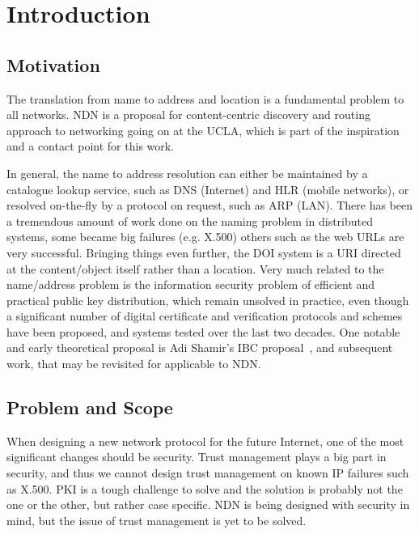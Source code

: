 \chapter{Introduction}\label{chp:introduction} 

\section{Motivation}
The translation from name to address and location is a fundamental problem to all networks.
\gls{NDN} is a proposal for content-centric discovery and routing approach to networking
going on at the \gls{UCLA}, which is part of the inspiration and a contact point for this work.

In general, the name to address resolution can either be maintained by a catalogue lookup service, 
such as \gls{DNS} (Internet) and \gls{HLR} (mobile networks), 
or resolved on-the-fly by a protocol on request, such as \gls{ARP} (\gls{LAN}). 
There has been a tremendous amount of work done on the naming problem in distributed systems, 
some became big failures (e.g. X.500) others such as the web \gls{URL}s are very successful. 
Bringing things even further, the \gls{DOI} system is a \gls{URI} directed at the content/object itself rather than a location. 
Very much related to the name/address problem is the information security problem of efficient and practical public key distribution, 
which remain unsolved in practice, even though a significant number of digital certificate and verification protocols and schemes have been proposed, and systems tested over the last two decades. 
One notable and early theoretical proposal is Adi Shamir's \gls{IBC} proposal~\cite{DBLP:conf/crypto/Shamir84},
and subsequent work, that may be revisited for applicable to \gls{NDN}.

\section{Problem and Scope}

When designing a new network protocol for the future Internet, one of the most significant changes should be security.
Trust management plays a big part in security, and thus we cannot design trust management on known \gls{IP} failures such as X.500. 
\gls{PKI} is a tough challenge to solve and the solution is probably not the one or the other, but rather case specific.
\gls{NDN} is being designed with security in mind, but the issue of trust management is yet to be solved.

